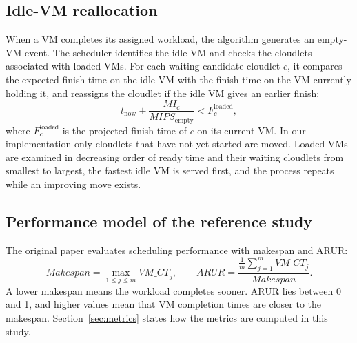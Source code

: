\documentclass[default,sn-mathphys,Numbered]{sn-jnl}
\begin{document}
\subsection{Idle-VM reallocation}
When a VM completes its assigned workload, the algorithm generates an empty-VM event. The scheduler identifies the idle VM and checks the cloudlets associated with loaded VMs. For each waiting candidate cloudlet $c$, it compares the expected finish time on the idle VM with the finish time on the VM currently holding it, and reassigns the cloudlet if the idle VM gives an earlier finish:
\begin{equation}\label{eq:realloc}
t_{\text{now}} + \frac{\mathit{MI}_c}{\mathit{MIPS}_{\text{empty}}} < F_c^{\text{loaded}},
\end{equation}
where $F_c^{\text{loaded}}$ is the projected finish time of $c$ on its current VM. In our implementation only cloudlets that have not yet started are moved. Loaded VMs are examined in decreasing order of ready time and their waiting cloudlets from smallest to largest, the fastest idle VM is served first, and the process repeats while an improving move exists.

\subsection{Performance model of the reference study}
The original paper evaluates scheduling performance with makespan and ARUR:
\begin{equation}\label{eq:mkarur}
\mathit{Makespan} = \max_{1 \le j \le m} \mathit{VM\_CT}_j, \qquad
\mathit{ARUR} = \frac{\frac{1}{m}\sum_{j=1}^{m} \mathit{VM\_CT}_j}{\mathit{Makespan}} .
\end{equation}
A lower makespan means the workload completes sooner. ARUR lies between 0 and 1, and higher values mean that VM completion times are closer to the makespan. Section~\ref{sec:metrics} states how the metrics are computed in this study.
\end{document}

